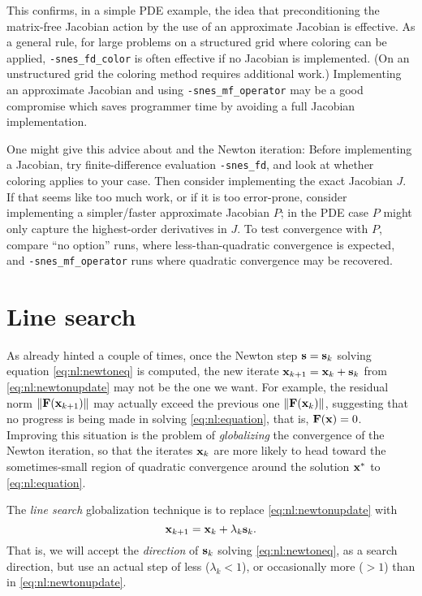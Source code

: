 This confirms, in a simple PDE example, the idea that preconditioning the matrix-free Jacobian action by the use of an approximate Jacobian is effective.  As a general rule, for large problems on a structured grid where coloring can be applied, \texttt{-snes\_fd\_color} is often effective if no Jacobian is implemented.  (On an unstructured grid the coloring method requires additional work.)  Implementing an approximate Jacobian and using \texttt{-snes\_mf\_operator} may be a good compromise which saves programmer time by avoiding a full Jacobian implementation.

One might give this advice about \pSNES and the Newton iteration:  Before implementing a Jacobian, try finite-difference evaluation  \texttt{-snes\_fd}, and look at whether coloring applies to your case.  Then consider implementing the exact Jacobian $J$.  If that seems like too much work, or if it is too error-prone, consider implementing a simpler/faster approximate Jacobian $P$; in the PDE case $P$ might only capture the highest-order derivatives in $J$.  To test convergence with $P$, compare ``no option'' runs, where less-than-quadratic convergence is expected, and \texttt{-snes\_mf\_operator} runs where quadratic convergence may be recovered.


\section{Line search} \label{sec:linesearch}

As already hinted a couple of times, once the Newton step $\mathbf{s} = \mathbf{s}_k$ solving equation \eqref{eq:nl:newtoneq} is computed, the new iterate $\mathbf{x}_{k+1} = \mathbf{x}_k + \mathbf{s}_k$ from \eqref{eq:nl:newtonupdate} may not be the one we want.  For example, the residual norm $\|\mathbf{F}(\mathbf{x}_{k+1})\|$ may actually exceed the previous one $\|\mathbf{F}(\mathbf{x}_{k})\|$, suggesting that no progress is being made in solving \eqref{eq:nl:equation}, that is, $\mathbf{F}(\mathbf{x})=0$.  Improving this situation is the problem of \emph{globalizing} the convergence of the Newton iteration, so that the iterates $\mathbf{x}_k$ are more likely to head toward the sometimes-small region of quadratic convergence around the solution $\mathbf{x}^*$ to \eqref{eq:nl:equation}.

The \emph{line search} globalization technique \citep{DennisSchnabel1983} is to replace \eqref{eq:nl:newtonupdate}  with
\begin{equation}
\mathbf{x}_{k+1} = \mathbf{x}_k + \lambda_k \mathbf{s}_k.  \label{eq:nl:linesearchupdate}
\end{equation}
That is, we will accept the \emph{direction} of $\mathbf{s}_k$ solving \eqref{eq:nl:newtoneq}, as a search direction, but use an actual step of less ($\lambda_k < 1$), or occasionally more ($>1$) than in \eqref{eq:nl:newtonupdate}.

